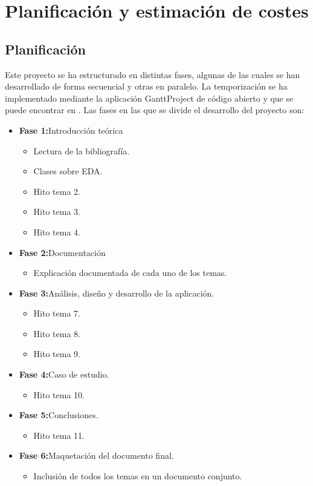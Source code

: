 \chapter{Planificación y estimación de costes}
\section{Planificación}

Este proyecto se ha estructurado en distintas fases, algunas de las cuales se han desarrollado de forma secuencial y otras en paralelo. La temporización se ha implementado mediante la aplicación GanttProject de código abierto y que se puede encontrar en \cite{GP}.
\bigskip
Las fases en las que se divide el desarrollo del proyecto son:

\begin{itemize}
\item \textbf{Fase 1:}Introducción teórica
	\begin{itemize}
	\item Lectura de la bibliografía.
	\item Clases sobre EDA.
	\item Hito tema 2.
	\item Hito tema 3.
	\item Hito tema 4.
	\end{itemize}
\item \textbf{Fase 2:}Documentación
	\begin{itemize}
	\item Explicación documentada de cada uno de los temas.
	\end{itemize}
	\item \textbf{Fase 3:}Análisis, diseño y desarrollo de la aplicación.
	\begin{itemize}
	\item Hito tema 7.
	\item Hito tema 8.
	\item Hito tema 9.
	\end{itemize}
	\item \textbf{Fase 4:}Caso de estudio.
	\begin{itemize}
	\item Hito tema 10.
	\end{itemize}
	\item \textbf{Fase 5:}Conclusiones.
	\begin{itemize}
	\item Hito tema 11.
	\end{itemize}
	\item \textbf{Fase 6:}Maquetación del documento final.
	\begin{itemize}
	\item Inclusión de todos los temas en un documento conjunto.
	\end{itemize}
\end{itemize}


